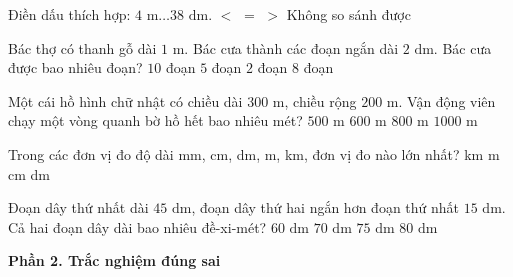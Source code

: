 \begin{ex} %
Điền dấu thích hợp: $4\text{ m} \dots 38\text{ dm}$.
\choice
{$<$}
{$=$}
{\True $>$}
{Không so sánh được}
\end{ex}

\begin{ex} %
Bác thợ có thanh gỗ dài $1\text{ m}$. Bác cưa thành các đoạn ngắn dài $2\text{ dm}$. Bác cưa được bao nhiêu đoạn?
\choice
{$10$ đoạn}
{\True $5$ đoạn}
{$2$ đoạn}
{$8$ đoạn}
\end{ex}

\begin{ex} %
Một cái hồ hình chữ nhật có chiều dài $300\text{ m}$, chiều rộng $200\text{ m}$. Vận động viên chạy một vòng quanh bờ hồ hết bao nhiêu mét?
\choice
{$500\text{ m}$}
{$600\text{ m}$}
{$800\text{ m}$}
{\True $1 000\text{ m}$}
\end{ex}

\begin{ex} %
Trong các đơn vị đo độ dài mm, cm, dm, m, km, đơn vị đo nào lớn nhất?
\choice
{\True km}
{m}
{cm}
{dm}
\end{ex}

\begin{ex} %
Đoạn dây thứ nhất dài $45\text{ dm}$, đoạn dây thứ hai ngắn hơn đoạn thứ nhất $15\text{ dm}$. Cả hai đoạn dây dài bao nhiêu đề-xi-mét?
\choice
{$60\text{ dm}$}
{$70\text{ dm}$}
{\True $75\text{ dm}$}
{$80\text{ dm}$}
\end{ex}

\textbf{Phần 2. Trắc nghiệm đúng sai}

